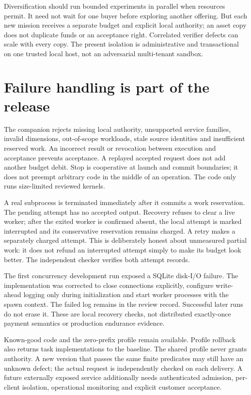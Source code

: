 \documentclass[11pt,letterpaper]{article}
\begin{document}
Diversification should run bounded experiments in parallel when resources permit. It need not wait for one buyer before exploring another offering. But each new mission receives a separate budget and explicit local authority; an asset copy does not duplicate funds or an acceptance right. Correlated verifier defects can scale with every copy. The present isolation is administrative and transactional on one trusted local host, not an adversarial multi-tenant sandbox.

\section{Failure handling is part of the release}
The companion rejects missing local authority, unsupported service families, invalid dimensions, out-of-scope workloads, stale source identities and insufficient reserved work. An incorrect result or revocation between execution and acceptance prevents acceptance. A replayed accepted request does not add another budget debit. Stop is cooperative at launch and commit boundaries; it does not preempt arbitrary code in the middle of an operation. The code only runs size-limited reviewed kernels.

A real subprocess is terminated immediately after it commits a work reservation. The pending attempt has no accepted output. Recovery refuses to clear a live worker; after the exited worker is confirmed absent, the local attempt is marked interrupted and its conservative reservation remains charged. A retry makes a separately charged attempt. This is deliberately honest about unmeasured partial work: it does not refund an interrupted attempt simply to make its budget look better. The independent checker verifies both attempt records.

The first concurrency development run exposed a SQLite disk-I/O failure. The implementation was corrected to close connections explicitly, configure write-ahead logging only during initialization and start worker processes with the spawn context. The failed log remains in the review record. Successful later runs do not erase it. These are local recovery checks, not distributed exactly-once payment semantics or production endurance evidence.

Known-good code and the zero-prefix profile remain available. Profile rollback also returns task implementations to the baseline. The shared profile never grants authority. A new version that passes the same finite predicates may still have an unknown defect; the actual request is independently checked on each delivery. A future externally exposed service additionally needs authenticated admission, per-client isolation, operational monitoring and explicit customer acceptance.
\end{document}
